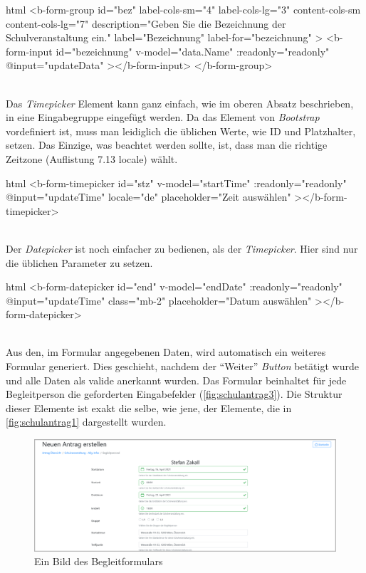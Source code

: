 \begin{code}{html}
	<b-form-group
        id="bez"
        label-cols-sm="4"
        label-cols-lg="3"
        content-cols-sm
        content-cols-lg="7"
        description="Geben Sie die Bezeichnung der Schulveranstaltung ein."
        label="Bezeichnung"
        label-for="bezeichnung"
    >
        <b-form-input
            id="bezeichnung"
            v-model="data.Name"
            :readonly="readonly"
            @input="updateData"
        ></b-form-input>
    </b-form-group>
\end{code}
~\\
Das \textit{Timepicker} Element kann ganz einfach, wie im oberen Absatz beschrieben, in eine Eingabegruppe eingefügt werden. Da das Element von \textit{Bootstrap} vordefiniert ist, muss man leidiglich die üblichen Werte, wie ID und Platzhalter, setzen. Das Einzige, was beachtet werden sollte, ist, dass man die richtige Zeitzone (Auflistung 7.13 locale) wählt.
\begin{code}{html}
	<b-form-timepicker
		id="stz"
		v-model="startTime"
		:readonly="readonly"
		@input="updateTime"
		locale="de"
		placeholder="Zeit auswählen"
  	></b-form-timepicker>
\end{code}
~\\
Der \textit{Datepicker} ist noch einfacher zu bedienen, als der \textit{Timepicker}. Hier sind nur die üblichen Parameter zu setzen.
\begin{code}{html}
	<b-form-datepicker
		id="end"
		v-model="endDate"
		:readonly="readonly"
		@input="updateTime"
		class="mb-2"
		placeholder="Datum auswählen"
  	></b-form-datepicker>
\end{code}
	\label{list:bspinputgroup} ~\\
Aus den, im Formular angegebenen Daten, wird automatisch ein weiteres Formular generiert. Dies geschieht, nachdem der \enquote{Weiter} \textit{Button} betätigt wurde und alle Daten als valide anerkannt wurden. Das Formular beinhaltet für jede Begleitperson die geforderten Eingabefelder (\autoref{fig:schulantrag3}). Die Struktur dieser Elemente ist exakt die selbe, wie jene, der Elemente, die in \autoref{fig:schulantrag1} dargestellt wurden. 
\begin{figure}[H]
	\centering
	\includegraphics[width=1\linewidth]{images/website/schul_3_1}
	\caption[Begleitformular]{Ein Bild des Begleitformulars}
	\label{fig:schulantrag3}
\end{figure}
